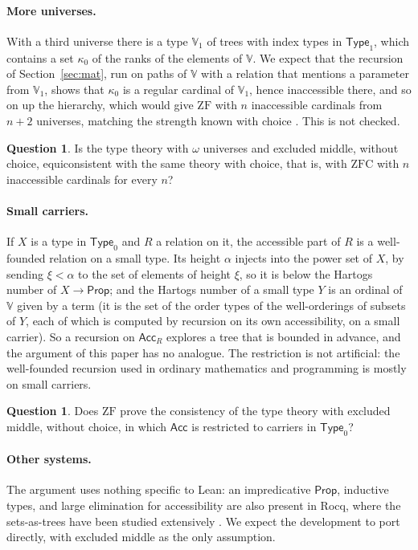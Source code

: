 \documentclass[10pt]{article}
\theoremstyle{definition}
\newtheorem{question}[theorem]{Question}
\theoremstyle{remark}
\newcommand{\Prop}{\mathsf{Prop}}
\newcommand{\Type}{\mathsf{Type}}
\newcommand{\ZF}{\mathrm{ZF}}
\newcommand{\ZFC}{\mathrm{ZFC}}
\newcommand{\Acc}{\mathsf{Acc}}
\newcommand{\V}{\mathbb{V}}
\begin{document}
\paragraph{More universes.}
With a third universe there is a type $\V_1$ of trees with index types
in $\Type_1$, which contains a set $\kappa_0$ of the ranks of the elements
of $\V$. We expect that the recursion of Section~\ref{sec:mat}, run on
paths of $\V$ with a relation that mentions a parameter from $\V_1$,
shows that $\kappa_0$ is a regular cardinal of $\V_1$, hence inaccessible
there, and so on up the hierarchy, which would give $\ZF$ with $n$
inaccessible cardinals from $n+2$ universes, matching the strength known
with choice \cite{werner97,carneiro19,kirstsmolka19}. This is not checked.

\begin{question}
Is the type theory with $\omega$ universes and excluded middle, without
choice, equiconsistent with the same theory with choice, that is, with
$\ZFC$ with $n$ inaccessible cardinals for every $n$?
\end{question}

\paragraph{Small carriers.}
If $X$ is a type in $\Type_0$ and $R$ a relation on it, the accessible
part of $R$ is a well-founded relation on a small type. Its height $\alpha$
injects into the power set of $X$, by sending $\xi<\alpha$ to the set of
elements of height $\xi$, so it is below the Hartogs number of
$X\to\Prop$; and the Hartogs number of a small type $Y$ is an ordinal of
$\V$ given by a term (it is the set of the order types of the
well-orderings of subsets of $Y$, each of which is computed by recursion
on its own accessibility, on a small carrier). So a recursion
on $\Acc_R$ explores a tree that is bounded in advance, and the argument
of this paper has no analogue. The restriction is not artificial: the
well-founded recursion used in ordinary mathematics and programming is
mostly on small carriers.

\begin{question}\label{q:small}
Does $\ZF$ prove the consistency of the type theory with excluded
middle, without choice, in which $\Acc$ is restricted to carriers in
$\Type_0$?
\end{question}

\paragraph{Other systems.}
The argument uses nothing specific to Lean: an impredicative $\Prop$,
inductive types, and large elimination for accessibility are also
present in Rocq, where the sets-as-trees have been
studied extensively \cite{werner97,barras10}. We expect the development
to port directly, with excluded middle as the only assumption.
\end{document}
